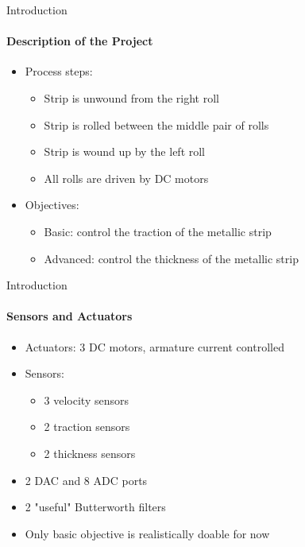 \begin{frame}{Introduction}
  \framesubtitle{Description of the Project}
  \begin{itemize}
    \item Process steps:
    \begin{itemize}
      \item Strip is unwound from the right roll
      \item Strip is rolled between the middle pair of rolls
      \item Strip is wound up by the left roll
      \item All rolls are driven by DC motors
    \end{itemize}
    \item Objectives:
    \begin{itemize}
      \item Basic: control the traction of the metallic strip
      \item Advanced: control the thickness of the metallic strip
    \end{itemize}
  \end{itemize}
\end{frame}

\begin{frame}{Introduction}
  \framesubtitle{Sensors and Actuators}
  \begin{itemize}
    \item Actuators: 3 DC motors, armature current controlled
    \item Sensors:
    \begin{itemize}
      \item 3 velocity sensors
      \item 2 traction sensors
      \item 2 thickness sensors
    \end{itemize}
    \item 2 DAC and 8 ADC ports
    \item 2 "useful" Butterworth filters
    \item Only basic objective is realistically doable for now
  \end{itemize}
\end{frame}

